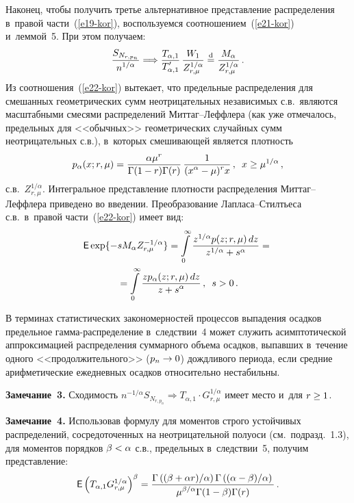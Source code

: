 \begin{multicols}{2}
Наконец, чтобы получить третье альтернативное представление
распределения в~правой части~(\ref{e19-kor}), воспользуемся соотношением~(\ref{e21-kor}) 
и~леммой~5. При этом получаем:
\begin{equation}
\displaystyle\frac{\displaystyle S_{N_{r,p_n}}\mathstrut}{\displaystyle n^{1/\alpha}\mathstrut}\Longrightarrow
\displaystyle\frac{\displaystyle T_{\alpha,1}\mathstrut}{\displaystyle T'_{\alpha,1}\mathstrut}\,
\displaystyle\frac{\displaystyle W_1\mathstrut}{\displaystyle Z_{r,\mu}^{1/\alpha}\mathstrut}\stackrel{\mathrm{d}}{=}
\displaystyle\frac{\displaystyle M_{\alpha}\mathstrut}{\displaystyle Z_{r,\mu}^{1/\alpha}\mathstrut}\,.\label{e22-kor}
\end{equation}
Из соотношения~(\ref{e22-kor}) вытекает, что предельные распределения для
смешанных геометрических сумм неотрицательных независимых с.в.\
являются масштаб\-ными смесями распределений Мит\-таг--Леф\-фле\-ра (как уже
отмечалось, предельных для <<обычных>> геометрических случайных сумм
не\-от\-ри\-ца\-тель\-ных с.в.), в~которых смешивающей является плотность
$$
p_{\alpha}(x;r,\mu)=\displaystyle\frac{\displaystyle \alpha\mu^r\mathstrut}{\displaystyle \Gamma(1-r)\Gamma(r)\mathstrut}\,
\displaystyle\frac{\displaystyle 1\mathstrut}{\displaystyle (x^{\alpha}-\mu)^rx\mathstrut}\,,\enskip
x\ge\mu^{1/\alpha}\,,
$$
с.в.~$Z_{r,\mu}^{1/\alpha}$. Интегральное представление плот\-ности
распределения Мит\-таг--Леф\-фле\-ра приведено во введении. Пре\-об\-ра\-зо\-ва\-ние
Лап\-ла\-са--Стил\-ть\-еса с.в.\
в~правой части~(\ref{e22-kor}) имеет вид:
\begin{multline*}
{\sf E}\exp\{-sM_{\alpha}Z_{r,\mu}^{-1/\alpha}\}=
\int\limits_{0}^{\infty}\frac{z^{1/\alpha}p(z;r,\mu)\,dz}{z^{1/\alpha}+s^{\alpha}}={}\\
{}=
\int\limits_{0}^{\infty}\displaystyle\frac{\displaystyle zp_{\alpha}(z;r,\mu)\,dz\mathstrut}{\displaystyle z+s^{\alpha}\mathstrut}\,,\enskip
s>0\,.
\end{multline*}

В терминах статистических закономерностей процессов выпадения
осадков предельное гам\-ма-рас\-пре\-де\-ле\-ние в~следствии~4 может служить
асимптотической аппроксимацией распределения суммарного объема
осадков, выпавших в~течение одно\-го <<продолжительного>> ($p_n\hm\to0$)
дождливого периода, если средние арифметические ежедневных осадков
относительно нестабильны.

\smallskip

\noindent
\textbf{Замечание~3.} Сходимость
$n^{-1/\alpha}S_{N_{r,p_n}}\Longrightarrow T_{\alpha,1}\cdot
G_{r,\mu}^{1/\alpha}$ имеет место и~для $r\hm\ge 1$.

\smallskip

\noindent
\textbf{Замечание~4.} Использовав формулу для моментов строго
устойчивых распределений, сосредоточенных на неотрицательной полуоси
(см.\ подразд.~1.3), для моментов порядков $\beta\hm<\alpha$ с.в.,
предельных в~следствии~5, получим представление:
$$
{\sf E}\left(T_{\alpha,1}G_{r,\mu}^{1/\alpha}\right)^{\beta}=
\displaystyle\frac{\displaystyle \Gamma\left(({\beta+\alpha r})/{\alpha}\right)\Gamma
\left(({\alpha-\beta})/{\alpha}\right)\mathstrut}{\displaystyle \mu^{\beta/\alpha}\Gamma(1-\beta)\Gamma(r)\mathstrut}\,.
$$



\end{multicols}
